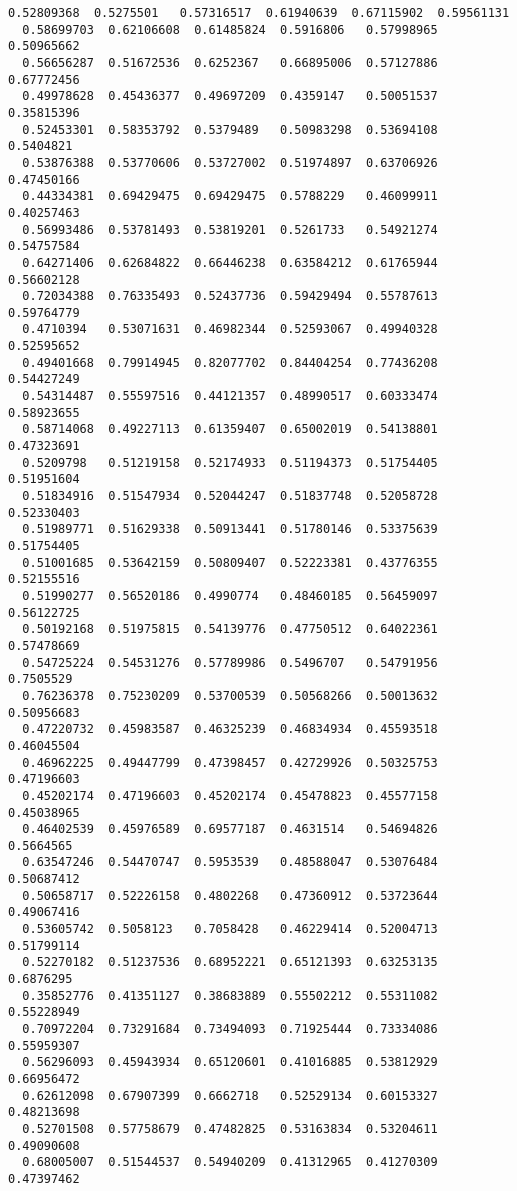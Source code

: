 \documentclass[11pt]{article}
\begin{document}
\begin{Verbatim}[commandchars=\\\{\}]
  0.52809368  0.5275501   0.57316517  0.61940639  0.67115902  0.59561131
  0.58699703  0.62106608  0.61485824  0.5916806   0.57998965  0.50965662
  0.56656287  0.51672536  0.6252367   0.66895006  0.57127886  0.67772456
  0.49978628  0.45436377  0.49697209  0.4359147   0.50051537  0.35815396
  0.52453301  0.58353792  0.5379489   0.50983298  0.53694108  0.5404821
  0.53876388  0.53770606  0.53727002  0.51974897  0.63706926  0.47450166
  0.44334381  0.69429475  0.69429475  0.5788229   0.46099911  0.40257463
  0.56993486  0.53781493  0.53819201  0.5261733   0.54921274  0.54757584
  0.64271406  0.62684822  0.66446238  0.63584212  0.61765944  0.56602128
  0.72034388  0.76335493  0.52437736  0.59429494  0.55787613  0.59764779
  0.4710394   0.53071631  0.46982344  0.52593067  0.49940328  0.52595652
  0.49401668  0.79914945  0.82077702  0.84404254  0.77436208  0.54427249
  0.54314487  0.55597516  0.44121357  0.48990517  0.60333474  0.58923655
  0.58714068  0.49227113  0.61359407  0.65002019  0.54138801  0.47323691
  0.5209798   0.51219158  0.52174933  0.51194373  0.51754405  0.51951604
  0.51834916  0.51547934  0.52044247  0.51837748  0.52058728  0.52330403
  0.51989771  0.51629338  0.50913441  0.51780146  0.53375639  0.51754405
  0.51001685  0.53642159  0.50809407  0.52223381  0.43776355  0.52155516
  0.51990277  0.56520186  0.4990774   0.48460185  0.56459097  0.56122725
  0.50192168  0.51975815  0.54139776  0.47750512  0.64022361  0.57478669
  0.54725224  0.54531276  0.57789986  0.5496707   0.54791956  0.7505529
  0.76236378  0.75230209  0.53700539  0.50568266  0.50013632  0.50956683
  0.47220732  0.45983587  0.46325239  0.46834934  0.45593518  0.46045504
  0.46962225  0.49447799  0.47398457  0.42729926  0.50325753  0.47196603
  0.45202174  0.47196603  0.45202174  0.45478823  0.45577158  0.45038965
  0.46402539  0.45976589  0.69577187  0.4631514   0.54694826  0.5664565
  0.63547246  0.54470747  0.5953539   0.48588047  0.53076484  0.50687412
  0.50658717  0.52226158  0.4802268   0.47360912  0.53723644  0.49067416
  0.53605742  0.5058123   0.7058428   0.46229414  0.52004713  0.51799114
  0.52270182  0.51237536  0.68952221  0.65121393  0.63253135  0.6876295
  0.35852776  0.41351127  0.38683889  0.55502212  0.55311082  0.55228949
  0.70972204  0.73291684  0.73494093  0.71925444  0.73334086  0.55959307
  0.56296093  0.45943934  0.65120601  0.41016885  0.53812929  0.66956472
  0.62612098  0.67907399  0.6662718   0.52529134  0.60153327  0.48213698
  0.52701508  0.57758679  0.47482825  0.53163834  0.53204611  0.49090608
  0.68005007  0.51544537  0.54940209  0.41312965  0.41270309  0.47397462

\end{Verbatim}
\end{document}

